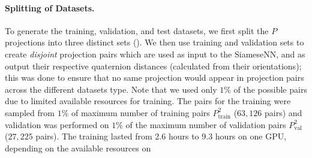 \paragraph{Splitting of Datasets.}
To generate the training, validation, and test datasets, we first split the $P$ projections into three distinct sets ().
We then use training and validation sets to create \textit{disjoint} projection pairs which are used as input to the SiameseNN, and as output their respective quaternion distances (calculated from their orientations); this was done to ensure that no same projection would appear in projection pairs across the different datasets type.
Note that we used only $1\%$ of the possible pairs due to limited available resources for training.
 The pairs for the training were sampled from $1\%$ of maximum number of training pairs $P_{\text{train}}^2$ ($63,126$ pairs) and validation was performed on $1\%$ of the maximum number of validation pairs $P_{\text{val}}^2$ ($27,225$ pairs).  The training lasted from 2.6 hours to 9.3 hours on one GPU, depending on the available resources on  


